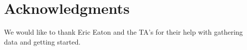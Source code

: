 \documentclass{article}
\begin{document}
\section*{Acknowledgments}

We would like to thank Eric Eaton and the TA's for their help with gathering data and getting started.


\nocite{*}



\end{document}
